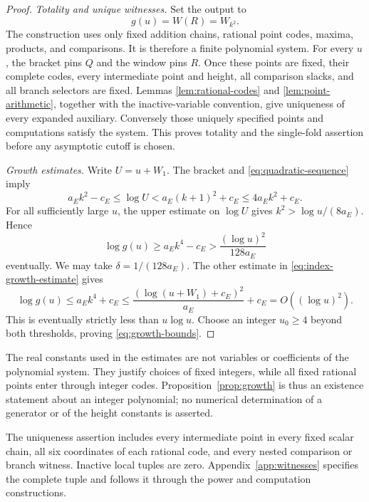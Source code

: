 \begin{proof}
\smallskip
\noindent\emph{Totality and unique witnesses.}
Set the output to
\[
 g(u)=W(R)=W_{k^2}.
\]
The construction uses only fixed addition chains, rational point
codes, maxima, products, and comparisons.  It is therefore a finite
polynomial system.  For every \(u\), the bracket pins \(Q\)
and the window pins \(R\).  Once these points are fixed, their
complete codes, every intermediate point and height, all comparison
slacks, and all branch selectors are fixed.  Lemmas
\ref{lem:rational-codes} and \ref{lem:point-arithmetic}, together
with the inactive-variable convention, give uniqueness of every
expanded auxiliary.  Conversely those uniquely specified points and
computations satisfy the system.  This proves totality and the
single-fold assertion before any asymptotic cutoff is chosen.

\smallskip
\noindent\emph{Growth estimates.}
Write \(U=u+W_1\). The
bracket and \eqref{eq:quadratic-sequence} imply
\begin{equation}\label{eq:index-growth-estimate}
 a_Ek^2-c_E\le\log U
   <a_E(k+1)^2+c_E\le4a_Ek^2+c_E.
\end{equation}
For all sufficiently large \(u\), the upper estimate on \(\log U\)
gives \(k^2>\log u/(8a_E)\).  Hence
\[
 \log g(u)\ge a_Ek^4-c_E
       >\frac{(\log u)^2}{128a_E}
\]
eventually.  We may take \(\delta=1/(128a_E)\).
The other estimate in \eqref{eq:index-growth-estimate} gives
\[
 \log g(u)\le a_Ek^4+c_E
    \le\frac{(\log(u+W_1)+c_E)^2}{a_E}+c_E
    =O((\log u)^2).
\]
This is eventually strictly less than \(u\log u\).
Choose an integer \(u_0\ge4\) beyond both thresholds, proving
\eqref{eq:growth-bounds}.
\end{proof}

The real constants used in the estimates are not variables or
coefficients of the polynomial system.  They justify choices of
fixed integers, while all fixed rational points enter through integer
codes.  Proposition~\ref{prop:growth} is thus an existence statement
about an integer polynomial; no numerical determination of a generator
or of the height constants is asserted.



The uniqueness assertion includes every intermediate point in every
fixed scalar chain, all six coordinates of each rational code, and every
nested comparison or branch witness. Inactive local tuples are zero.
Appendix~\ref{app:witnesses} specifies the complete tuple and follows it
through the power and computation constructions.

